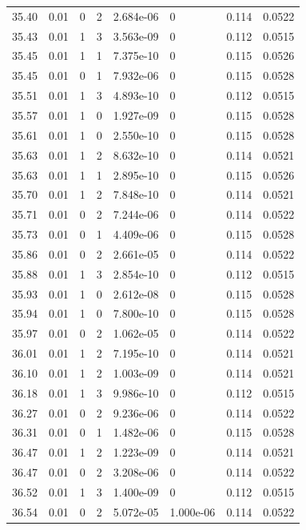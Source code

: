 \documentclass[preview]{standalone}
\begin{document}
{{{{{{{{{{{{{{{\begin{tabular}{L{1.2cm}C{1.2cm} C{0.3cm}C{0.5cm} C{1.4cm}C{1.4cm} C{1.4cm}C{1.4cm}}
  35.40  &  0.01  & 0     &  2 &  2.684e-06  & 0  & 0.114 &  0.0522   \\ 
  35.43  &  0.01  & 1     &  3 &  3.563e-09  & 0  & 0.112 &  0.0515   \\ 
  35.45  &  0.01  & 1     &  1 &  7.375e-10  & 0  & 0.115 &  0.0526   \\ 
  35.45  &  0.01  & 0     &  1 &  7.932e-06  & 0  & 0.115 &  0.0528   \\ 
  35.51  &  0.01  & 1     &  3 &  4.893e-10  & 0  & 0.112 &  0.0515   \\ 
  35.57  &  0.01  & 1     &  0 &  1.927e-09  & 0  & 0.115 &  0.0528   \\ 
  35.61  &  0.01  & 1     &  0 &  2.550e-10  & 0  & 0.115 &  0.0528   \\ 
  35.63  &  0.01  & 1     &  2 &  8.632e-10  & 0  & 0.114 &  0.0521   \\ 
  35.63  &  0.01  & 1     &  1 &  2.895e-10  & 0  & 0.115 &  0.0526   \\ 
  35.70  &  0.01  & 1     &  2 &  7.848e-10  & 0  & 0.114 &  0.0521   \\ 
  35.71  &  0.01  & 0     &  2 &  7.244e-06  & 0  & 0.114 &  0.0522   \\ 
  35.73  &  0.01  & 0     &  1 &  4.409e-06  & 0  & 0.115 &  0.0528   \\ 
  35.86  &  0.01  & 0     &  2 &  2.661e-05  & 0  & 0.114 &  0.0522   \\ 
  35.88  &  0.01  & 1     &  3 &  2.854e-10  & 0  & 0.112 &  0.0515   \\ 
  35.93  &  0.01  & 1     &  0 &  2.612e-08  & 0  & 0.115 &  0.0528   \\ 
  35.94  &  0.01  & 1     &  0 &  7.800e-10  & 0  & 0.115 &  0.0528   \\ 
  35.97  &  0.01  & 0     &  2 &  1.062e-05  & 0  & 0.114 &  0.0522   \\ 
  36.01  &  0.01  & 1     &  2 &  7.195e-10  & 0  & 0.114 &  0.0521   \\ 
  36.10  &  0.01  & 1     &  2 &  1.003e-09  & 0  & 0.114 &  0.0521   \\ 
  36.18  &  0.01  & 1     &  3 &  9.986e-10  & 0  & 0.112 &  0.0515   \\ 
  36.27  &  0.01  & 0     &  2 &  9.236e-06  & 0  & 0.114 &  0.0522   \\ 
  36.31  &  0.01  & 0     &  1 &  1.482e-06  & 0  & 0.115 &  0.0528   \\ 
  36.47  &  0.01  & 1     &  2 &  1.223e-09  & 0  & 0.114 &  0.0521   \\ 
  36.47  &  0.01  & 0     &  2 &  3.208e-06  & 0  & 0.114 &  0.0522   \\ 
  36.52  &  0.01  & 1     &  3 &  1.400e-09  & 0  & 0.112 &  0.0515   \\ 
  36.54  &  0.01  & 0     &  2 &  5.072e-05  & 1.000e-06  & 0.114 &  0.0522   \\ 
\hline 
\end{tabular} 

}}}}}}}}}}}}}}}
\end{document}
